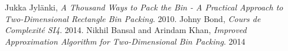 \documentclass[12pt]{article}
\begin{document}
\newpage
\begin{thebibliography}{9}
         Jukka Jylänki,
          \emph{A Thousand Ways to Pack the Bin - A Practical Approach to Two-Dimensional Rectangle Bin Packing}.
          2010.
         Johny Bond,
          \emph{Cours de Complexité SI4}.
          2014.
\bibitem
		Nikhil Bansal and Arindam Khan,
		\emph{Improved Approximation Algorithm for
Two-Dimensional Bin Packing}.
		2014
\end{thebibliography}
\end{document}

